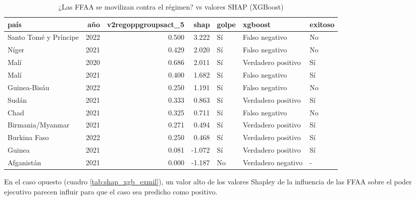 \documentclass{article}
\begin{document}
 \begin{table}[H]
  \centering
  \begin{tabular}{lrrrlll}
   \toprule
   país & año & v2regoppgroupsact\_5 & shap & golpe & xgboost & exitoso \\
   \midrule
   Santo Tomé y Príncipe & 2022 & 0.500 & 3.222 & Sí & Falso negativo & No \\
   Níger & 2021 & 0.429 & 2.020 & Sí & Falso negativo & No \\
   Malí & 2020 & 0.686 & 2.011 & Sí & Verdadero positivo & Sí \\
   Malí & 2021 & 0.400 & 1.682 & Sí & Falso negativo & Sí \\
   Guinea-Bisáu & 2022 & 0.250 & 1.191 & Sí & Falso negativo & No \\
   Sudán & 2021 & 0.333 & 0.863 & Sí & Verdadero positivo & Sí \\
   Chad & 2021 & 0.325 & 0.711 & Sí & Falso negativo & No \\
   Birmania/Myanmar & 2021 & 0.271 & 0.494 & Sí & Verdadero positivo & Sí \\
   Burkina Faso & 2022 & 0.250 & 0.468 & Sí & Verdadero positivo & Sí \\
   Guinea & 2021 & 0.081 & -1.072 & Sí & Verdadero positivo & Sí \\
   Afganistán & 2021 & 0.000 & -1.187 & No & Verdadero negativo & - \\
   \bottomrule
  \end{tabular}
  \caption{¿Las FFAA se movilizan contra el régimen? vs valores SHAP (XGBoost) \label{tab:shap_xgb_regopp}}
 \end{table}

 En el caso opuesto (cuadro \ref{tab:shap_xgb_exmil}), un valor alto de los valores 
 Shapley de la influencia de las FFAA sobre el poder ejecutivo parecen influir para 
 que el caso sea predicho como positivo.
\end{document}
